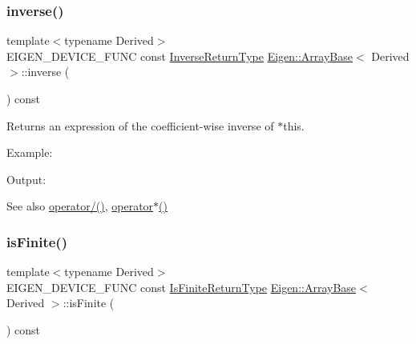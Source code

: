 \subsubsection{\texorpdfstring{inverse()}{inverse()}}
{\footnotesize\ttfamily template$<$typename Derived$>$ \\
E\+I\+G\+E\+N\+\_\+\+D\+E\+V\+I\+C\+E\+\_\+\+F\+U\+NC const \mbox{\hyperlink{class_eigen_1_1_cwise_unary_op}{Inverse\+Return\+Type}} \mbox{\hyperlink{class_eigen_1_1_array_base}{Eigen\+::\+Array\+Base}}$<$ Derived $>$\+::inverse (\begin{DoxyParamCaption}{ }\end{DoxyParamCaption}) const\hspace{0.3cm}{\ttfamily [inline]}}

\begin{DoxyReturn}{Returns}
an expression of the coefficient-\/wise inverse of $\ast$this.
\end{DoxyReturn}
Example\+: 
\begin{DoxyCodeInclude}{0}
\end{DoxyCodeInclude}
 Output\+: 
\begin{DoxyVerbInclude}
\end{DoxyVerbInclude}


\begin{DoxySeeAlso}{See also}
\mbox{\hyperlink{class_eigen_1_1_array_base_a65770de30d83fefe046011c1d2258391}{operator/()}}, \mbox{\hyperlink{group___geometry___module_gae9451098be60e8ceda3c583d96e0aee1}{operator$\ast$()}} 
\end{DoxySeeAlso}
\mbox{\label{class_eigen_1_1_array_base_a4e06a44043a006a487c57acf068305a2}} 
\subsubsection{\texorpdfstring{isFinite()}{isFinite()}}
{\footnotesize\ttfamily template$<$typename Derived$>$ \\
E\+I\+G\+E\+N\+\_\+\+D\+E\+V\+I\+C\+E\+\_\+\+F\+U\+NC const \mbox{\hyperlink{class_eigen_1_1_cwise_unary_op}{Is\+Finite\+Return\+Type}} \mbox{\hyperlink{class_eigen_1_1_array_base}{Eigen\+::\+Array\+Base}}$<$ Derived $>$\+::is\+Finite (\begin{DoxyParamCaption}{ }\end{DoxyParamCaption}) const\hspace{0.3cm}{\ttfamily [inline]}}

